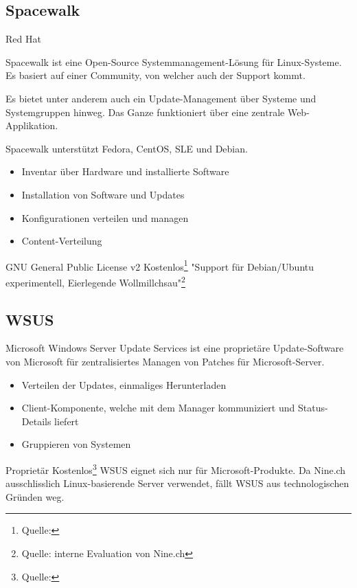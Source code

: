 \subsection{Spacewalk}

{Red Hat}
{Spacewalk ist eine Open-Source Systemmanagement-Lösung für Linux-Systeme. Es basiert auf einer Community, von welcher auch der Support kommt.

Es bietet unter anderem auch ein Update-Management über Systeme und Systemgruppen hinweg. Das Ganze funktioniert über eine zentrale Web-Applikation.

Spacewalk unterstützt Fedora, CentOS, SLE und Debian.}
{\begin{itemize}
\item Inventar über Hardware und installierte Software
\item Installation von Software und Updates
\item Konfigurationen verteilen und managen
\item Content-Verteilung
\end{itemize}}
{GNU General Public License v2}
{Kostenlos\footnote{Quelle: }}
{}
{"Support für Debian/Ubuntu experimentell, Eierlegende Wollmillchsau"\footnote{Quelle: interne Evaluation von Nine.ch}}

\subsection{WSUS}

{Microsoft}
{Windows Server Update Services ist eine proprietäre Update-Software von Microsoft für zentralisiertes Managen von Patches für Microsoft-Server.}
{\begin{itemize}
\item Verteilen der Updates, einmaliges Herunterladen
\item Client-Komponente, welche mit dem Manager kommuniziert und Status-Details liefert
\item Gruppieren von Systemen
\end{itemize}}
{Proprietär}
{Kostenlos\footnote{Quelle: }}
{}
{WSUS eignet sich nur für Microsoft-Produkte. Da Nine.ch ausschlisslich Linux-basierende Server verwendet, fällt WSUS aus technologischen Gründen weg.}

